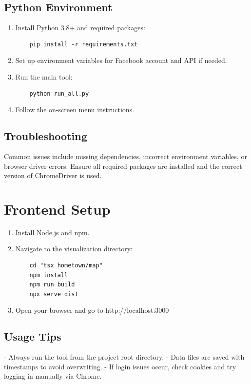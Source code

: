 \documentclass[13pt,a4paper]{report}
\begin{document}
\subsection{Python Environment}
\begin{enumerate}
    \item Install Python 3.8+ and required packages:
    \begin{verbatim}
    pip install -r requirements.txt
    \end{verbatim}
    \item Set up environment variables for Facebook account and API if needed.
    \item Run the main tool:
    \begin{verbatim}
    python run_all.py
    \end{verbatim}
    \item Follow the on-screen menu instructions.
\end{enumerate}

\subsection{Troubleshooting}
Common issues include missing dependencies, incorrect environment variables, or browser driver errors. Ensure all required packages are installed and the correct version of ChromeDriver is used.

\section{Frontend Setup}
\begin{enumerate}
    \item Install Node.js and npm.
    \item Navigate to the visualization directory:
    \begin{verbatim}
    cd "tsx hometown/map"
    npm install
    npm run build
    npx serve dist
    \end{verbatim}
    \item Open your browser and go to http://localhost:3000
\end{enumerate}

\subsection{Usage Tips}
- Always run the tool from the project root directory.
- Data files are saved with timestamps to avoid overwriting.
- If login issues occur, check cookies and try logging in manually via Chrome.
\end{document}
